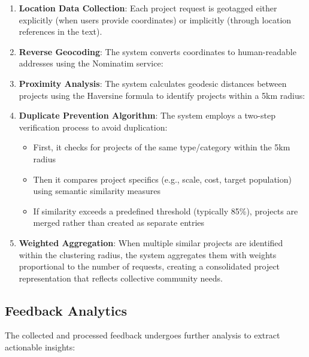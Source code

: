 \documentclass[12pt,a4paper]{report}
\begin{document}
\begin{enumerate}
    \item \textbf{Location Data Collection}: Each project request is geotagged either explicitly (when users provide coordinates) or implicitly (through location references in the text).
    
    \item \textbf{Reverse Geocoding}: The system converts coordinates to human-readable addresses using the Nominatim service:
    
    \item \textbf{Proximity Analysis}: The system calculates geodesic distances between projects using the Haversine formula to identify projects within a 5km radius:

    \item \textbf{Duplicate Prevention Algorithm}: The system employs a two-step verification process to avoid duplication:
    \begin{itemize}
        \item First, it checks for projects of the same type/category within the 5km radius
        \item Then it compares project specifics (e.g., scale, cost, target population) using semantic similarity measures
        \item If similarity exceeds a predefined threshold (typically 85\%), projects are merged rather than created as separate entries
    \end{itemize}
    
    \item \textbf{Weighted Aggregation}: When multiple similar projects are identified within the clustering radius, the system aggregates them with weights proportional to the number of requests, creating a consolidated project representation that reflects collective community needs.
\end{enumerate}

\subsection{Feedback Analytics}
\indent \indent The collected and processed feedback undergoes further analysis to extract actionable insights:
\end{document}
